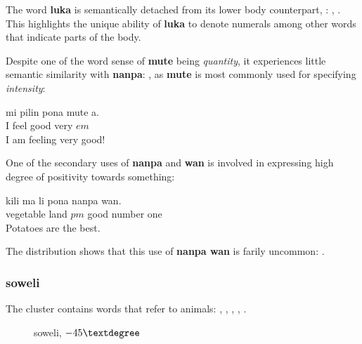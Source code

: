 \documentclass[14pt, a4paper]{extreport}
\makeatletter
\DeclareRobustCommand\ttfamily
        {\not@math@alphabet\ttfamily\mathtt
         \fontfamily\ttdefault\small\selectfont}
\makeatother
\begin{document}
The word \textbf{luka} is semantically detached from its lower body counterpart, : , . This highlights the unique ability of \textbf{luka} to denote numerals among other words that indicate parts of the body.

Despite one of the word sense of \textbf{mute} being \textit{quantity}, it experiences little semantic similarity with \textbf{nanpa}: , as \textbf{mute} is most commonly used for specifying \textit{intensity}:

\begin{exe}
  \ex
  \gll mi pilin pona mute a. \\
       I feel good very $em$ \\
  \glt I am feeling very good!
\end{exe}

One of the secondary uses of \textbf{nanpa} and \textbf{wan} is involved in expressing high degree of positivity towards something:

\begin{exe}
  \ex
  \gll kili ma li pona nanpa wan. \\
       vegetable land $pm$ good number one \\
  \glt Potatoes are the best.
\end{exe}

The distribution shows that this use of \textbf{nanpa wan} is farily uncommon: .
      \subsubsection{soweli}
The cluster  contains words that refer to animals: , , , , .

\begin{figure}[ht]%
  \def\angle{-45}
  \bigskip
  \centering
  \caption{soweli, \(\angle\textdegree\)}
\end{figure}%
\end{document}
